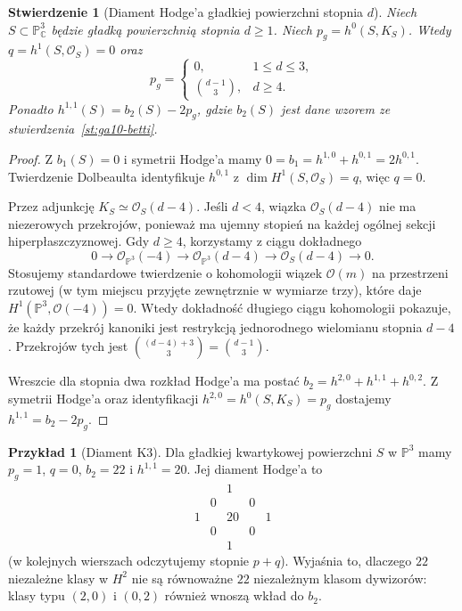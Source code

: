 \documentclass[11pt,a4paper,openany]{report}
\numberwithin{equation}{section}
\theoremstyle{plain}
\newtheorem{stwierdzenie}[twierdzenie]{Stwierdzenie}
\theoremstyle{definition}
\newtheorem{przyklad}[twierdzenie]{Przykład}
\theoremstyle{remark}
\newcommand{\C}{\mathbb C}
\newcommand{\PP}{\mathbb P}
\begin{document}
\begin{stwierdzenie}[Diament Hodge'a gładkiej powierzchni stopnia $d$]
\label{st:ga10-hodge-hypersurf}
Niech $S\subset\PP^3_\C$ będzie gładką powierzchnią
stopnia $d\ge1$. Niech $p_g=h^0(S,K_S)$.
Wtedy $q=h^1(S,\mathcal O_S)=0$ oraz
\[
 p_g=\begin{cases}0,&1\le d\le3,\\
 \binom{d-1}{3},&d\ge4.\end{cases}
\]
Ponadto $h^{1,1}(S)=b_2(S)-2p_g$, gdzie
$b_2(S)$ jest dane wzorem ze
stwierdzenia~\ref{st:ga10-betti}.
\end{stwierdzenie}
\begin{proof}
Z $b_1(S)=0$ i symetrii Hodge'a mamy
$0=b_1=h^{1,0}+h^{0,1}=2h^{0,1}$.
Twierdzenie Dolbeaulta identyfikuje
$h^{0,1}$ z $\dim H^1(S,\mathcal O_S)=q$,
więc $q=0$.

Przez adjunkcję $K_S\simeq\mathcal O_S(d-4)$.
Jeśli $d<4$, wiązka $\mathcal O_S(d-4)$ nie ma
niezerowych przekrojów, ponieważ ma ujemny stopień
na każdej ogólnej sekcji hiperpłaszczyznowej.
Gdy $d\ge4$, korzystamy z ciągu dokładnego
\[
 0\to\mathcal O_{\PP^3}(-4)\longrightarrow
 \mathcal O_{\PP^3}(d-4)\longrightarrow
 \mathcal O_S(d-4)\to0.
\]
Stosujemy standardowe twierdzenie o kohomologii wiązek
$\mathcal O(m)$ na przestrzeni rzutowej (w tym miejscu
przyjęte zewnętrznie w wymiarze trzy), które daje
$H^1(\PP^3,\mathcal O(-4))=0$. Wtedy dokładność
długiego ciągu kohomologii pokazuje, że każdy przekrój
kanoniki jest restrykcją jednorodnego wielomianu
stopnia $d-4$. Przekrojów tych jest
$\binom{(d-4)+3}{3}=\binom{d-1}{3}$.

Wreszcie dla stopnia dwa rozkład Hodge'a ma postać
$b_2=h^{2,0}+h^{1,1}+h^{0,2}$.
Z symetrii Hodge'a oraz identyfikacji
$h^{2,0}=h^0(S,K_S)=p_g$ dostajemy
$h^{1,1}=b_2-2p_g$.
\end{proof}

\begin{przyklad}[Diament K3]
Dla gładkiej kwartykowej powierzchni $S$ w $\PP^3$
mamy $p_g=1$, $q=0$, $b_2=22$ i $h^{1,1}=20$.
Jej diament Hodge'a to
\[
 \begin{array}{ccccc}
 &&1&&\\
 &0&&0&\\
 1&&20&&1\\
 &0&&0&\\
 &&1&&
 \end{array}
\]
(w kolejnych wierszach odczytujemy stopnie $p+q$).
Wyjaśnia to, dlaczego $22$ niezależne klasy w $H^2$
nie są równoważne $22$ niezależnym klasom dywizorów:
klasy typu $(2,0)$ i $(0,2)$ również wnoszą wkład do $b_2$.
\end{przyklad}
\end{document}
